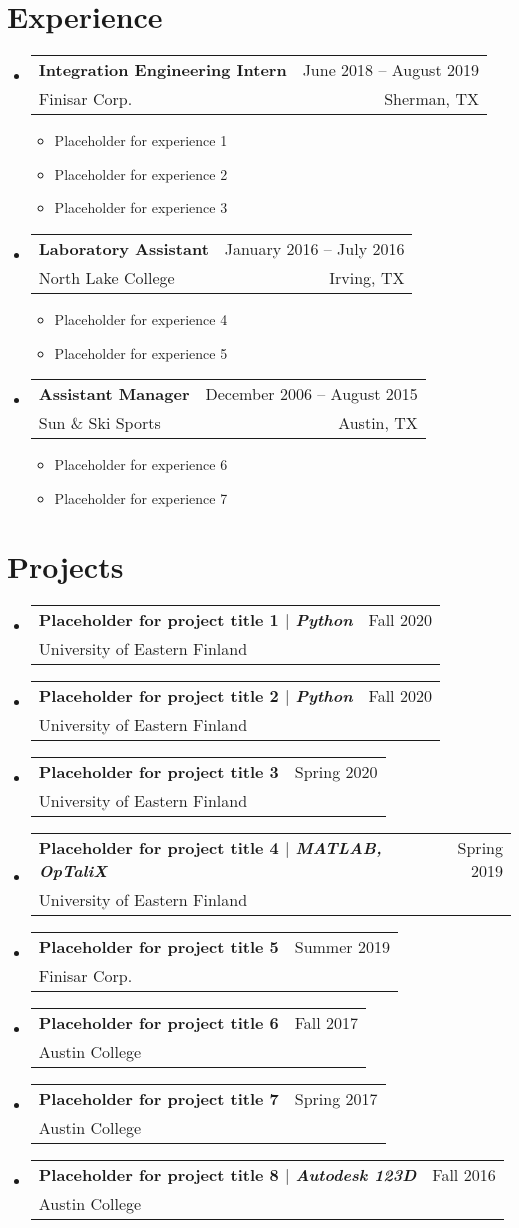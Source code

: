 \documentclass[A4,11pt]{article}
\makeatletter
\newcommand{\CVItem}[1]{
  \item\small{
    {#1 \vspace{-2pt}}
  }
}
\newcommand{\CVSubheading}[4]{
  \vspace{-2pt}\item
    \begin{tabular*}{0.97\textwidth}[t]{l@{\extracolsep{\fill}}r}
      \textbf{#1} & #2 \\
      \small#3 & \small #4 \\
    \end{tabular*}\vspace{-7pt}
}
\newcommand{\CVSubHeadingListStart}{\begin{itemize}[leftmargin=0.5cm, label={}]}
\newcommand{\CVSubHeadingListEnd}{\end{itemize}}
\newcommand{\CVItemListStart}{\begin{itemize}}
\newcommand{\CVItemListEnd}{\end{itemize}\vspace{-5pt}}
\makeatother
\begin{document}
\section{Experience}
  \CVSubHeadingListStart
    \CVSubheading
      {Integration Engineering Intern}{June 2018 -- August 2019}
      {Finisar Corp.}{Sherman, TX}
      \CVItemListStart
        \CVItem{Placeholder for experience 1}
        \CVItem{Placeholder for experience 2}
        \CVItem{Placeholder for experience 3}
      \CVItemListEnd
    \CVSubheading
      {Laboratory Assistant}{January 2016 -- July 2016}
      {North Lake College}{Irving, TX}
      \CVItemListStart
        \CVItem{Placeholder for experience 4}
        \CVItem{Placeholder for experience 5}
      \CVItemListEnd
    \CVSubheading
      {Assistant Manager}{December 2006 -- August 2015}
      {Sun \& Ski Sports}{Austin, TX}
      \CVItemListStart
        \CVItem{Placeholder for experience 6}
        \CVItem{Placeholder for experience 7}
      \CVItemListEnd
  \CVSubHeadingListEnd

\begin{comment}
Ideally the title of the work should speak for what it is. However if you feel
like you should explain more about why the project is applicable to this job,
use item list as is shown in the work experience section.
\end{comment}

\section{Projects}
  \CVSubHeadingListStart
    \CVSubheading
      {{Placeholder for project title 1} $|$ \emph{\small{Python}}}{Fall 2020}
      {University of Eastern Finland}{}
    \CVSubheading
      {{Placeholder for project title 2} $|$ \emph{\small{Python}}}{Fall 2020}
      {University of Eastern Finland}{}
    \CVSubheading
      {Placeholder for project title 3}{Spring 2020}
      {University of Eastern Finland}{}
    \CVSubheading
      {{Placeholder for project title 4} $|$ \emph{\small{MATLAB, OpTaliX}}}{Spring 2019}
      {University of Eastern Finland}{}
    \CVSubheading
      {Placeholder for project title 5}{Summer 2019}
      {Finisar Corp.}{}
    \CVSubheading
      {Placeholder for project title 6}{Fall 2017}
      {Austin College}{}
    \CVSubheading
      {Placeholder for project title 7}{Spring 2017}
      {Austin College}{}
    \CVSubheading
      {{Placeholder for project title 8} $|$ \emph{\small{Autodesk 123D}}}{Fall 2016}
      {Austin College}{}
  \CVSubHeadingListEnd
\end{document}
